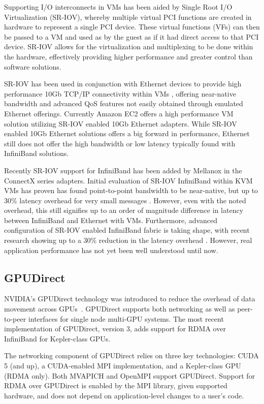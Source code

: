 Supporting I/O interconnects in VMs has been aided by Single Root I/O Virtualization (SR-IOV), whereby multiple virtual PCI functions are created in hardware to represent a single PCI device. These virtual functions (VFs) can then be passed to a VM and used as by the guest as if it had direct access to that PCI device. SR-IOV allows for the virtualization and multiplexing to be done within the hardware, effectively providing higher performance and greater control than software solutions. 

SR-IOV has been used in conjunction with Ethernet devices to provide high performance 10Gb TCP/IP connectivity within VMs \cite{Liu2010}, offering near-native bandwidth and advanced QoS features not easily obtained through emulated Ethernet offerings. Currently Amazon EC2 offers a high performance VM solution utilizing SR-IOV enabled 10Gb Ethernet adapters. While SR-IOV enabled 10Gb Ethernet solutions offers a big forward in performance, Ethernet still does not offer the high bandwidth or low latency typically found with InfiniBand solutions. 

Recently SR-IOV support for InfiniBand has been added by Mellanox in the ConnectX series adapters. Initial evaluation of SR-IOV InfiniBand within KVM VMs has proven has found point-to-point bandwidth to be near-native, but up to 30\% latency overhead for very small messages \cite{jose2013sr, RuivoAGTKNR14}. However, even with the noted overhead, this still signifies up to an order of magnitude difference in latency between InfiniBand and Ethernet with VMs. Furthermore, advanced configuration of SR-IOV enabled InfiniBand fabric is taking shape, with recent research showing up to a 30\% reduction in the latency overhead \cite{Musleh2014cloud}. However, real application performance has not yet been well understood until now. 

\subsection{GPUDirect}
NVIDIA's GPUDirect technology was introduced to reduce the overhead of data
movement across GPUs~\cite{GPUDirect, shainer2011development}.  GPUDirect
supports both networking as
well as peer-to-peer interfaces for single node multi-GPU systems.  The most
recent implementation of GPUDirect, version 3, adds support for RDMA over
InfiniBand for Kepler-class GPUs.

The networking component of GPUDirect relies on three key technologies: CUDA 5
(and up), a CUDA-enabled MPI implementation, and a Kepler-class GPU (RDMA only).
Both MVAPICH and OpenMPI support GPUDirect.  Support for RDMA over GPUDirect is
enabled by the MPI library, given supported hardware, and does not depend on
application-level changes to a user's code.

